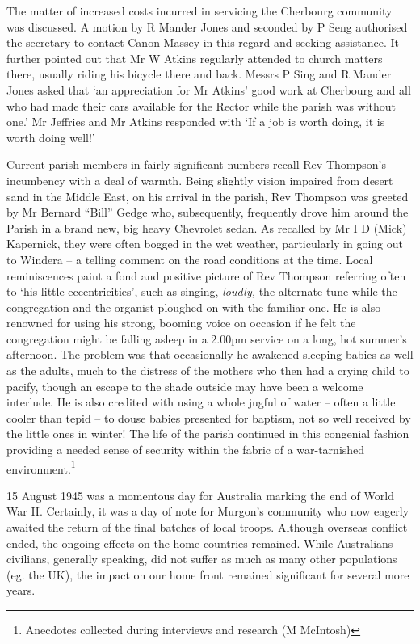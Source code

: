 The matter of increased costs incurred in servicing the Cherbourg
community was discussed. A motion by R Mander Jones and seconded by P
Seng authorised the secretary to contact Canon Massey in this regard and
seeking assistance. It further pointed out that Mr W Atkins regularly
attended to church matters there, usually riding his bicycle there and
back. Messrs P Sing and R Mander Jones asked that `an appreciation for
Mr Atkins' good work at Cherbourg and all who had made their cars
available for the Rector while the parish was without one.' Mr Jeffries
and Mr Atkins responded with `If a job is worth doing, it is worth doing
well!'

Current parish members in fairly significant numbers recall Rev
Thompson's incumbency with a deal of warmth. Being slightly vision
impaired from desert sand in the Middle East, on his arrival in the
parish, Rev Thompson was greeted by Mr Bernard ``Bill'' Gedge who,
subsequently, frequently drove him around the Parish in a brand new, big
heavy Chevrolet sedan. As recalled by Mr I D (Mick) Kapernick, they were
often bogged in the wet weather, particularly in going out to Windera --
a telling comment on the road conditions at the time. Local
reminiscences paint a fond and positive picture of Rev Thompson
referring often to `his little eccentricities', such as singing,
\emph{loudly,} the alternate tune while the congregation and the
organist ploughed on with the familiar one. He is also renowned for
using his strong, booming voice on occasion if he felt the congregation
might be falling asleep in a 2.00pm service on a long, hot summer's
afternoon. The problem was that occasionally he awakened sleeping babies
as well as the adults, much to the distress of the mothers who then had
a crying child to pacify, though an escape to the shade outside may have
been a welcome interlude. He is also credited with using a whole jugful
of water -- often a little cooler than tepid -- to douse babies
presented for baptism, not so well received by the little ones in
winter! The life of the parish continued in this congenial fashion
providing a needed sense of security within the fabric of a
war-tarnished environment.\footnote{Anecdotes collected during
  interviews and research (M McIntosh)}

15 August 1945 was a momentous day for Australia marking the end of
World War II. Certainly, it was a day of note for Murgon's community who
now eagerly awaited the return of the final batches of local troops.
Although overseas conflict ended, the ongoing effects on the home
countries remained. While Australians civilians, generally speaking, did
not suffer as much as many other populations (eg. the UK), the impact on
our home front remained significant for several more years.

